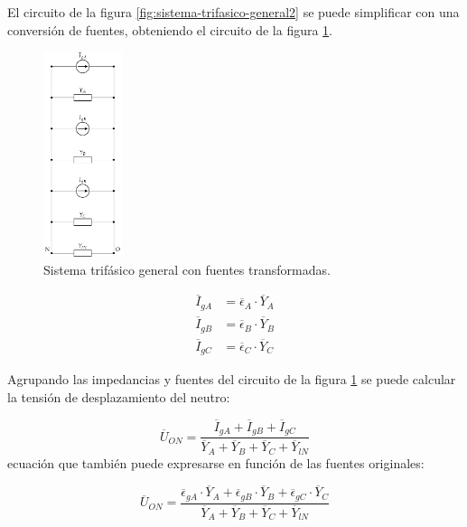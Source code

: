 El circuito de la figura \ref{fig:sistema-trifasico-general2} se puede simplificar con una conversión de fuentes, obteniendo el circuito de la figura \ref{fig:sistema-trifasico-general3}.

\begin{figure}[H]
  \centering
  \includegraphics[height=6cm]{../figs/CircuitoTrifasicaGeneralizado3.pdf}
  \caption{Sistema trifásico general con fuentes transformadas.}
  \label{fig:sistema-trifasico-general3}
\end{figure}

\begin{align*}
  \overline{I}_{gA} &= \overline{\epsilon}_A \cdot \overline{Y}_A\\
  \overline{I}_{gB} &= \overline{\epsilon}_B \cdot \overline{Y}_B\\
  \overline{I}_{gC} &= \overline{\epsilon}_C \cdot \overline{Y}_C
\end{align*}

Agrupando las impedancias y fuentes del circuito de la figura \ref{fig:sistema-trifasico-general3} se puede calcular la tensión de desplazamiento del neutro:

\begin{equation*}
  \overline{U}_{ON} = \frac{\overline{I}_{gA} + \overline{I}_{gB} + \overline{I}_{gC}}{\overline{Y}_A + \overline{Y}_B + \overline{Y}_C + \overline{Y}_{lN}}
\end{equation*}
ecuación que también puede expresarse en función de las fuentes originales:

\begin{equation}
  \overline{U}_{ON} = \frac{\overline{\epsilon}_{gA} \cdot \overline{Y}_A + \overline{\epsilon}_{gB} \cdot \overline{Y}_B + \overline{\epsilon}_{gC} \cdot \overline{Y}_C}{\overline{Y}_A + \overline{Y}_B + \overline{Y}_C + \overline{Y}_{lN}}
\label{eq:analisis-general}
\end{equation}

